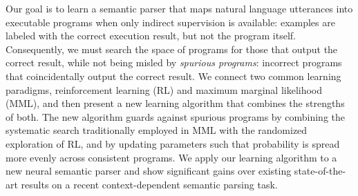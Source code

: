 Our goal is to learn a semantic parser that maps natural language utterances into executable programs when only indirect supervision is available: examples are labeled with the correct execution result, but not the program itself. Consequently, we must search the space of programs for those that output the correct result, while not being misled by \emph{spurious programs}: incorrect programs that coincidentally output the correct result. We connect two common learning paradigms, reinforcement learning (RL) and maximum marginal likelihood (MML), and then present a new learning algorithm that combines the strengths of both. The new algorithm guards against spurious programs by combining the systematic search traditionally employed in MML with the randomized exploration of RL, and by updating parameters such that probability is spread more evenly across consistent programs. We apply our learning algorithm to a new neural semantic parser and show significant gains over existing state-of-the-art results on a recent context-dependent semantic parsing task.
